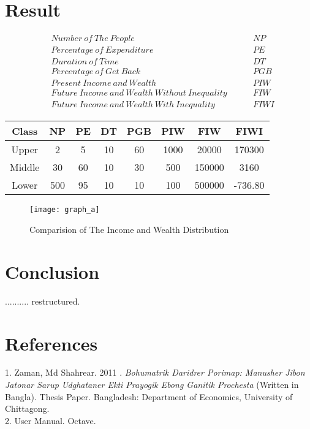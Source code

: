 \documentclass[12pt,a4paper]{article}
\begin{document}
 \section{Result}
 \begin{align}
 & Number\:of\: The\: People & \qquad NP \\
 & Percentage\: of\: Expenditure  &\qquad PE \\
 & Duration\: of\: Time  &\qquad DT \\
 & Percentage\: of\: Get\: Back  &\qquad PGB \\
 & Present\: Income\: and\: Wealth  &\qquad PIW \\
 & Future\: Income\: and\: Wealth\: Without\: Inequality\: &\qquad FIW \\
 & Future\: Income\: and\: Wealth\: With\: Inequality\:  &\qquad FIWI 
 \end{align}
\begin{tabular}{|c|c|c|c|c|c|c|c|}
	\hline 
	Class & NP & PE & DT & PGB & PIW& FIW & FIWI \\ 
	\hline 
	Upper & 2 & 5 & 10 & 60 & 1000 & 20000 &170300 \\ 
	\hline 
	Middle & 30 & 60 & 10 & 30 & 500 & 150000 &3160 \\ 
	\hline 
	Lower & 500 & 95 & 10 & 10 & 100 & 500000 &-736.80\\
	
\end{tabular}  
\newpage
\begin{figure}
\centering
\texttt{[image: graph\_a]}
\caption{Comparision of The Income and Wealth Distribution}
\label{}
\end{figure}

\newpage
\section{Conclusion}
.......... restructured.
\newpage
\section{References}
    1. Zaman, Md Shahrear. 2011 .\textit{ Bohumatrik Daridrer Porimap: Manusher Jibon Jatonar Sarup Udghataner Ekti Prayogik Ebong Ganitik Prochesta} (Written in Bangla). Thesis Paper. Bangladesh: Department of Economics, University of Chittagong.
   \\2. User Manual. Octave.  
    
    
	 
\end{document}
